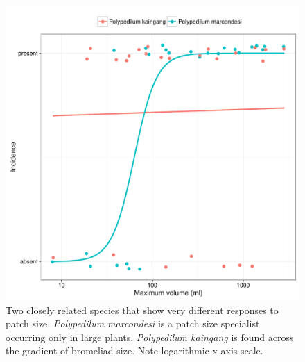 \begin{figure}[htbp]
\centering
\includegraphics[width=5.5in]{figures/poly_curve.pdf}
\caption[\emph{Polypedilum marcondesi} is a patch size specialist occurring
only in large plants. \emph{Polypedilum kaingang} is found across the
gradient of bromeliad size.]{Two closely
related species that show very different responses to patch size.
\emph{Polypedilum marcondesi} is a patch size specialist occurring
only in large plants. \emph{Polypedilum kaingang} is found across the
gradient of bromeliad size. Note logarithmic x-axis scale.}
\end{figure}


